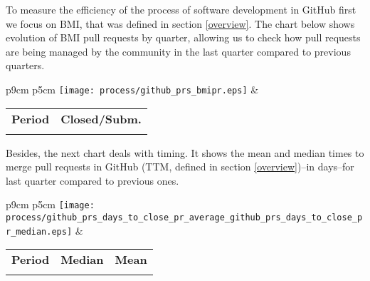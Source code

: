 To measure the efficiency of the process of software development in GitHub first we focus on BMI, that was defined in section \ref{overview}. The chart below shows evolution of BMI pull requests by quarter, allowing us to check how pull requests are being managed by the community in the last quarter compared to previous quarters.

\begin{tabular}{p{9cm} p{5cm}}
	\vspace{0pt} 
	\hspace*{-6cm}  
	\texttt{[image: process/github\_prs\_bmipr.eps]}
	& 
	\vspace{0pt}
	\begin{tabular}{l|l}%
		\bfseries Period & \bfseries Closed/Subm. %
		\csvreader[head to column names]{process/github_prs_bmipr.csv}{}%
		{\\\Date & \bmi}
	\end{tabular}
\end{tabular}

Besides, the next chart deals with timing. It shows the mean and median times to merge pull requests in GitHub (TTM, defined in section \ref{overview})--in days--for last quarter compared to previous ones.


\begin{tabular}{p{9cm} p{5cm}}
	\vspace{0pt} 
	\hspace*{-6cm}  
	\texttt{[image: process/github\_prs\_days\_to\_close\_pr\_average\_github\_prs\_days\_to\_close\_pr\_median.eps]}
	& 
	\vspace{0pt}
	\begin{tabular}{l|r|r|}%
		\bfseries Period & \bfseries Median & \bfseries Mean %
		\csvreader[head to column names]{process/github_prs_days_to_close_pr_average_github_prs_days_to_close_pr_median.csv}{}%
		{\\\Date & \daystocloseprmedian & \daystoclosepraverage}
	\end{tabular}
\end{tabular}
